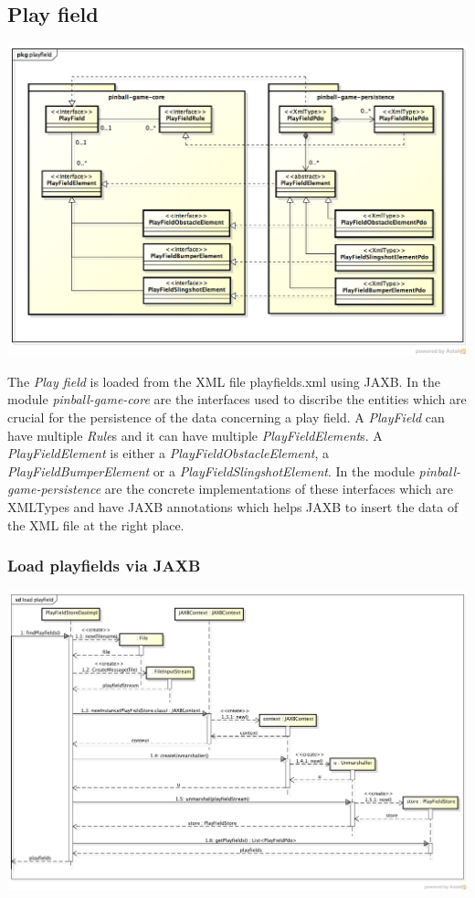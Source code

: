 \documentclass[fontsize=12pt,
               paper=a4,
               twoside=false,
               parskip=half,
               ]{scrartcl}
\begin{document}
\subsection{Play field}
\includegraphics[width=15.5cm]{./img/persistence-playfield.png}

The \emph{Play field} is loaded from the XML file playfields.xml using JAXB. In the module \emph{pinball-game-core} are the interfaces used to discribe the entities which are crucial for the persistence of the data concerning a play field. A \emph{PlayField} can have multiple \emph{Rule}s and it can have multiple \emph{PlayFieldElement}s. A \emph{PlayFieldElement} is either a \emph{PlayFieldObstacleElement}, a \emph{PlayFieldBumperElement} or a \emph{PlayFieldSlingshotElement}. In the module \emph{pinball-game-persistence} are the concrete implementations of these interfaces which are XMLTypes and have JAXB annotations which helps JAXB to insert the data of the XML file at the right place.

\subsubsection{Load playfields via JAXB}
\includegraphics[width=15.5cm]{./img/jaxb-load-playfield-sd.png}
\end{document}
